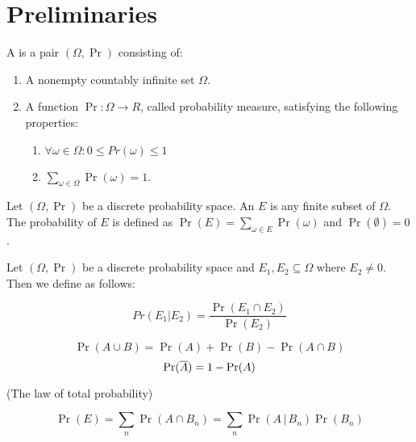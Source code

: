 

\chapter{Preliminaries}

\begin{defn}
	A  is a pair
	$ (\Omega,\Pr) $ consisting of:
	
	\begin{enumerate}
	\item A nonempty countably infinite set $ \Omega $.
	\item A function $ \Pr: \Omega \rightarrow R $, called probability measure, 
	satisfying the following properties:
		\begin{enumerate}
			\item $  \forall \omega \in \Omega: 0 \leq Pr(\omega) \leq 1 $ %
			\item $ \sum_{\omega \in \Omega}\Pr({\omega}) = 1 $.
		\end{enumerate}
	\end{enumerate}
\end{defn}

\begin{defn}
	Let $ (\Omega,\Pr) $ be a discrete probability space. An  $ E $ is any finite subset of $ \Omega $. The probability of $ E $ is defined as 
	$ \Pr(E) = \sum_{\omega \in E}\Pr(\omega)  $ and $ \Pr(\emptyset) = 0$.
\end{defn}

\begin{defn}
	Let $ (\Omega, \Pr) $ be a discrete probability space and $ E_{1}, E_{2} \subseteq \Omega $  where $ E_{2} \neq 0 $. Then we define  as follows:
	
	 \[ Pr(E_{1} | E_{2}) = \dfrac{\Pr(E_{1} \cap E_{2})}{\Pr(E_{2})} \]
\end{defn}

\begin{lemma}
	\[ \Pr(A \cup B) = \Pr(A) + \Pr(B) - \Pr(A \cap B) \]
	\[\Pr(\overline{A}) = 1-\Pr(A)\]
\end{lemma}


\begin{thm}
	(The law of total probability)
	
	\begin{equation}\label{totalProb}
	\Pr(E) = \sum_{n}\Pr(A \cap B_{n}) = \sum_{n}\Pr(A \, | \, B_{n})\Pr(B_{n})
	\end{equation}
	
	
	
\end{thm}

